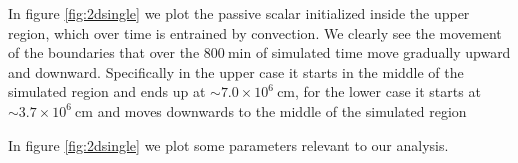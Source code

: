 \begin{figure}[t!]
  \centering
  \centering
  \hfill
  \caption{}
  \end{figure}
  In figure \ref{fig:2dsingle} we plot the passive scalar initialized inside the upper region, which over time is entrained by convection. We clearly see the movement of the boundaries that over the $800 \ \mathrm{min}$ of simulated time move gradually upward and downward. Specifically in the upper case it starts in the middle of the simulated region and ends up at $\sim 7.0 \times 10^{6} \ \mathrm{cm}$, for the lower case it starts at $\sim 3.7 \times 10^{6} \ \mathrm{cm}$ and moves downwards to the middle of the simulated region 

In figure \ref{fig:2dsingle} we plot some parameters relevant to our analysis. 

